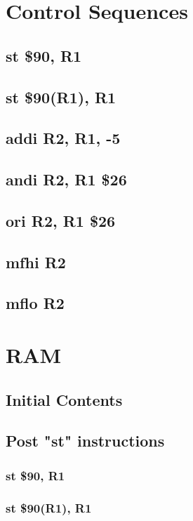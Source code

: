 \documentclass{article}
\begin{document}
\section{Control Sequences}
    \subsection{st \$90, R1} \label{st_case_1_sequence}
    \subsection{st \$90(R1), R1} \label{st_case_2_sequence}
    \subsection{addi R2, R1, -5} \label{addi_sequence}
    \subsection{andi R2, R1 \$26} \label{andi_sequence}
    \subsection{ori R2, R1 \$26} \label{ori_sequence}
    \subsection{mfhi R2} \label{mfhi_sequence}
    \subsection{mflo R2} \label{mflo_sequence}
\section{RAM}
    \subsection{Initial Contents} \label{ram_init}
    \subsection{Post "st" instructions}
        \subsubsection{st \$90, R1} \label{ram_st_case_1}
            
        \subsubsection{st \$90(R1), R1} \label{ram_st_case_2}
            
\end{document}
